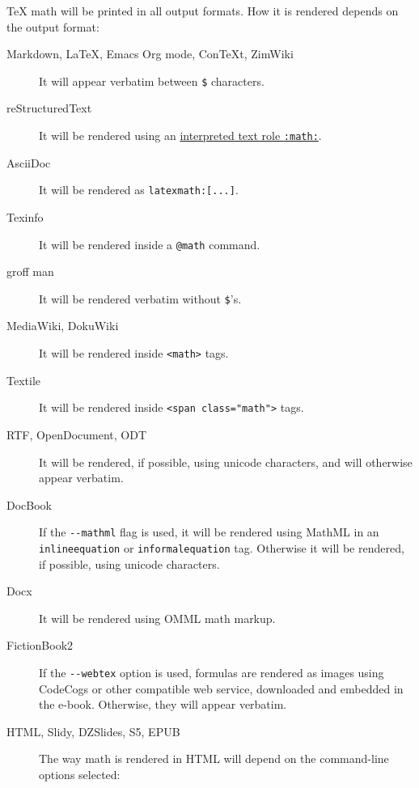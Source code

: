 \documentclass[]{article}
\begin{document}
TeX math will be printed in all output formats. How it is rendered
depends on the output format:

\begin{description}
\item[Markdown, LaTeX, Emacs Org mode, ConTeXt, ZimWiki]
It will appear verbatim between \texttt{\$} characters.
\item[reStructuredText]
It will be rendered using an
\href{http://docutils.sourceforge.net/docs/ref/rst/roles.html\#math}{interpreted
text role \texttt{:math:}}.
\item[AsciiDoc]
It will be rendered as \texttt{latexmath:{[}...{]}}.
\item[Texinfo]
It will be rendered inside a \texttt{@math} command.
\item[groff man]
It will be rendered verbatim without \texttt{\$}'s.
\item[MediaWiki, DokuWiki]
It will be rendered inside \texttt{\textless{}math\textgreater{}} tags.
\item[Textile]
It will be rendered inside
\texttt{\textless{}span\ class="math"\textgreater{}} tags.
\item[RTF, OpenDocument, ODT]
It will be rendered, if possible, using unicode characters, and will
otherwise appear verbatim.
\item[DocBook]
If the \texttt{-\/-mathml} flag is used, it will be rendered using
MathML in an \texttt{inlineequation} or \texttt{informalequation} tag.
Otherwise it will be rendered, if possible, using unicode characters.
\item[Docx]
It will be rendered using OMML math markup.
\item[FictionBook2]
If the \texttt{-\/-webtex} option is used, formulas are rendered as
images using CodeCogs or other compatible web service, downloaded and
embedded in the e-book. Otherwise, they will appear verbatim.
\item[HTML, Slidy, DZSlides, S5, EPUB]
The way math is rendered in HTML will depend on the command-line options
selected:


\end{description}
\end{document}
